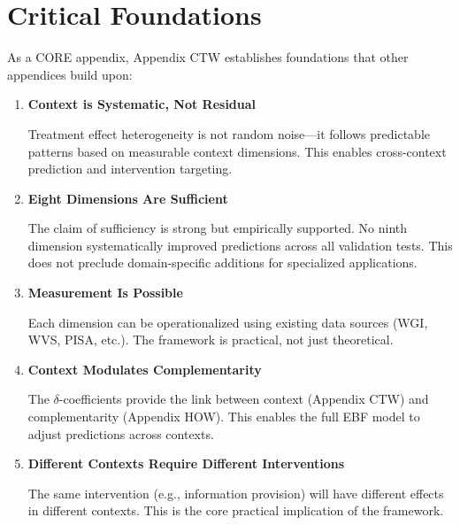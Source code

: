 \section{Critical Foundations}
\label{sec:V-foundations}

As a CORE appendix, Appendix CTW establishes foundations that other appendices build upon:

\begin{enumerate}
    \item \textbf{Context is Systematic, Not Residual}
    
    Treatment effect heterogeneity is not random noise---it follows predictable 
    patterns based on measurable context dimensions. This enables cross-context 
    prediction and intervention targeting.
    
    \item \textbf{Eight Dimensions Are Sufficient}
    
    The claim of sufficiency is strong but empirically supported. No ninth 
    dimension systematically improved predictions across all validation tests. 
    This does not preclude domain-specific additions for specialized applications.
    
    \item \textbf{Measurement Is Possible}
    
    Each dimension can be operationalized using existing data sources (WGI, WVS, 
    PISA, etc.). The framework is practical, not just theoretical.
    
    \item \textbf{Context Modulates Complementarity}
    
    The $\delta$-coefficients provide the link between context (Appendix CTW) and 
    complementarity (Appendix HOW). This enables the full EBF model to adjust 
    predictions across contexts.
    
    \item \textbf{Different Contexts Require Different Interventions}
    
    The same intervention (e.g., information provision) will have different effects 
    in different contexts. This is the core practical implication of the framework.
\end{enumerate}



